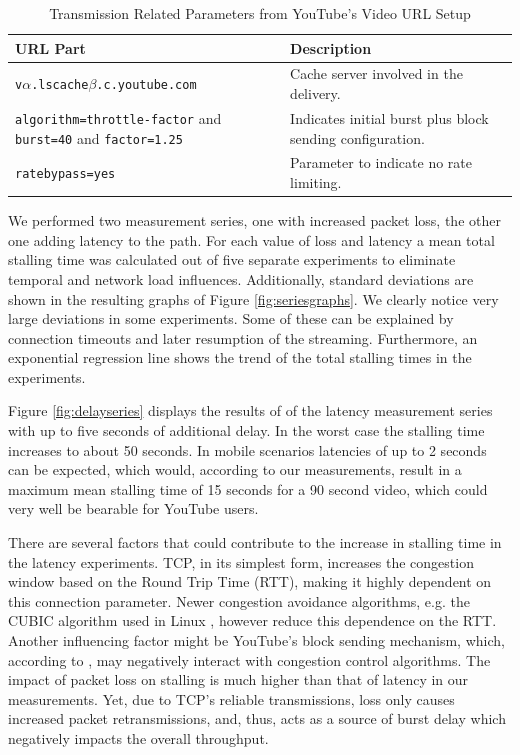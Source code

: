 \begin{table}
\renewcommand{\arraystretch}{1.3}
\caption{Transmission Related Parameters from YouTube's Video URL Setup}
\label{tbl:yturl}
\centering
\begin{tabular}{|p{4.7cm}||p{3.3cm}|}\hline
URL Part & Description \\ \hline \hline
\texttt{v$\alpha$.lscache$\beta$.c.youtube.com} &  Cache server involved in the delivery.\\ \hline
\texttt{algorithm=throttle-factor} and \texttt{burst=40} and \texttt{factor=1.25} & Indicates initial burst plus block sending configuration. \\ \hline
\texttt{ratebypass=yes} & Parameter to indicate no rate limiting.\\ \hline
\end{tabular}

\end{table}

We performed two measurement series, one with increased packet loss, the other one adding latency to the path. For each value of loss and latency a mean total stalling time was calculated out of five separate experiments to eliminate temporal and network load influences. Additionally, standard deviations are shown in the resulting graphs of Figure \ref{fig:seriesgraphs}. We clearly notice very large deviations in some experiments. Some of these can be explained by connection timeouts and later resumption of the streaming. Furthermore, an exponential regression line shows the trend of the total stalling times in the experiments.


Figure \ref{fig:delayseries} displays the results of of the latency measurement series with up to five seconds of additional delay. In the worst case the stalling time increases to about 50 seconds. In mobile scenarios latencies of up to 2 seconds can be expected, which would, according to our measurements, result in a maximum mean stalling time of 15 seconds for a 90 second video, which could very well be bearable for YouTube users.

There are several factors that could contribute to the increase in stalling time in the latency experiments. 
TCP, in its simplest form, increases the congestion window based on the Round Trip Time (RTT), making it highly dependent on this connection parameter. Newer congestion avoidance algorithms, e.g. the CUBIC algorithm used in Linux \cite{ha2008cubic}, however reduce this dependence on the RTT.
Another influencing factor might be YouTube's block sending mechanism, which, according to \cite{alcock2011afcyt}, may negatively interact with congestion control algorithms. The impact of packet loss on stalling is much higher than that of latency in our measurements. Yet, due to TCP's reliable transmissions, loss only causes increased packet retransmissions, and, thus, acts as a source of burst delay which negatively impacts the overall throughput.

